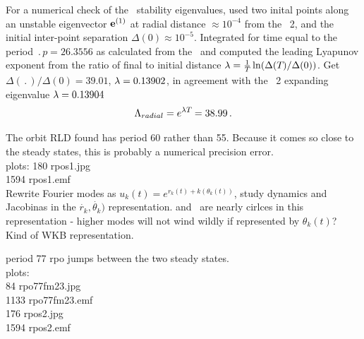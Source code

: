 For a numerical check of the \rpo\ stability eigenvalues,
used two inital
points along an unstable eigenvector ${\mathbf e}^{(1)}$
at radial distance  $\approx 10^{-4}$ from the \eqv\ {\nameit}2,
and the initial inter-point separation $\Delta(0) \approx 10^{-5}$.
Integrated for time equal to the period $\period{p}=26.3556$ as calculated from
the \jacobianM\ and computed the leading Lyapunov exponent from the ratio of
final to initial distance
$\lambda= \frac{1 }{ {T_{}}}\ln( \Delta({T_{}})/\Delta(0))$.
Get
$\Delta(\period{})/\Delta(0) =39.01$,
$\lambda=0.13902$, in agreement with the \eqv\ {\nameit}2
expanding eigenvalue $\lambda=0.13904$
\[
\Lambda_{radial} =  e^{\lambda {T_{}}} =38.99
\,.
\]

The orbit RLD found has period 60
rather than 55.  Because it comes so close to the steady states,
this is probably a numerical precision error.
\\
plots:
 180 rpos1.jpg  \\
1594 rpos1.emf  \\


Rewrite Fourier modes as $u_k(t) = e^{r_k(t) + k(\theta_k(t))}$, study
dynamics and Jacobinas in the $\dot{r_k},\dot{\theta_k})$ representation.
 and  \eqva\ are nearly cirlces in this representation - higher
modes will not wind wildly if represented by $\theta_k(t)$? Kind of WKB
representation.

period 77 rpo jumps between the two steady states.
\\
plots:  \\
  84 rpo77fm23.jpg  \\
1133 rpo77fm23.emf  \\
 176 rpos2.jpg  \\
1594 rpos2.emf  \\


\bigskip

